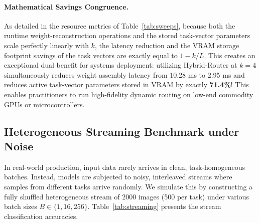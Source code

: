 \paragraph{Mathematical Savings Congruence.}
As detailed in the resource metrics of Table~\ref{tab:sweeps}, because both the runtime weight-reconstruction operations and the stored task-vector parameters scale perfectly linearly with $k$, the latency reduction and the VRAM storage footprint savings of the task vectors are exactly equal to $1 - k/L$. This creates an exceptional dual benefit for systems deployment: utilizing Hybrid-Router at $k=4$ simultaneously reduces weight assembly latency from 10.28 ms to 2.95 ms and reduces active task-vector parameters stored in VRAM by exactly \textbf{71.4\%}! This enables practitioners to run high-fidelity dynamic routing on low-end commodity GPUs or microcontrollers.

\subsection{Heterogeneous Streaming Benchmark under Noise}
In real-world production, input data rarely arrives in clean, task-homogeneous batches. Instead, models are subjected to noisy, interleaved streams where samples from different tasks arrive randomly. We simulate this by constructing a fully shuffled heterogeneous stream of $2000$ images (500 per task) under various batch sizes $B \in \{1, 16, 256\}$. Table~\ref{tab:streaming} presents the stream classification accuracies.


